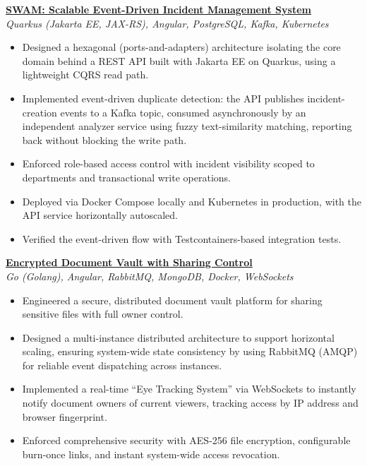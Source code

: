 \documentclass{res} %
\begin{document}
\begin{resume}
  \textbf{\href{https://github.com/msohailse/SWAM}{SWAM: Scalable Event-Driven Incident Management System}} \\
  {\sl Quarkus (Jakarta EE, JAX-RS), Angular, PostgreSQL, Kafka, Kubernetes} \smallskip
  \begin{itemize}
    \item Designed a hexagonal (ports-and-adapters) architecture isolating the core domain behind a REST API built with Jakarta EE on Quarkus, using a lightweight CQRS read path.
    \item Implemented event-driven duplicate detection: the API publishes incident-creation events to a Kafka topic, consumed asynchronously by an independent analyzer service using fuzzy text-similarity matching, reporting back without blocking the write path.
    \item Enforced role-based access control with incident visibility scoped to departments and transactional write operations.
    \item Deployed via Docker Compose locally and Kubernetes in production, with the API service horizontally autoscaled.
    \item Verified the event-driven flow with Testcontainers-based integration tests.
  \end{itemize}
  \vspace{6pt}

  \textbf{\href{https://youtu.be/0133H3u1IlU}{Encrypted Document Vault with Sharing Control}} \\
  {\sl Go (Golang), Angular, RabbitMQ, MongoDB, Docker, WebSockets} \smallskip
  \begin{itemize}
    \item Engineered a secure, distributed document vault platform for sharing sensitive files with full owner control.
    \item Designed a multi-instance distributed architecture to support horizontal scaling, ensuring system-wide state consistency by using RabbitMQ (AMQP) for reliable event dispatching across instances.
    \item Implemented a real-time ``Eye Tracking System'' via WebSockets to instantly notify document owners of current viewers, tracking access by IP address and browser fingerprint.
    \item Enforced comprehensive security with AES-256 file encryption, configurable burn-once links, and instant system-wide access revocation.
  \end{itemize}
  \vspace{6pt}


\end{resume}
\end{document}

